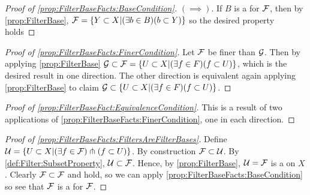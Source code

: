 \begin{prop}[FilterBaseFacts]
\begin{proof}[Proof of \ref{prop:FilterBaseFacts:BaseCondition}]
    $(\implies)$. If $B$ is a \FilterBase for $\mathcal{F}$, then by 
    \ref{prop:FilterBase}, $\mathcal{F}= \{Y \subset X | (\exists b \in B) ( b \subset Y) \}$
    so the desired property holds
   \end{proof}
   \begin{proof}[Proof of \ref{prop:FilterBaseFacts:FinerCondition}]
   Let $\mathcal{F}$ be finer than $\mathcal{G}$. Then 
   by applying \ref{prop:FilterBase}
   $\mathcal{G} \subset \mathcal{F} = \{ U \subset X | (\exists f \in F) (f \subset U) \}$, which is the desired result in one direction. 
   The other direction is equivalent again applying \ref{prop:FilterBase}
   to claim
   $\mathcal{G} \subset \{U \subset X | (\exists f \in F) ( f \subset U ) \}$.
   \end{proof}
   \begin{proof}[Proof of \ref{prop:FilterBaseFact:EquivalenceCondition}]
   This is a result of two applications of \ref{prop:FilterBaseFacts:FinerCondition}, 
   one in each direction. 
   \end{proof}
   \begin{proof}[Proof of \ref{prop:FilterBaseFacts:FiltersAreFilterBases}]
    Define $\mathcal{U} = \{U \subset X | (\exists f \in \mathcal{F}) \pitchfork(f \subset U )\}$. 
    By construction $\mathcal{F} \subset \mathcal{U}$. 
    By \ref{def:Filter:SubsetProperty}, $\mathcal{U} \subset \mathcal{F}$.
    Hence, by \ref{prop:FilterBase}, 
    $\mathcal{U} = \mathcal{F}$ is a \FilterBase on $X$. 
    Clearly $\mathcal{F} \subset \mathcal{F}$ and \scNested{\scF}{\scF} hold, so we can apply
    \ref{prop:FilterBaseFacts:BaseCondition} so see that $\mathcal{F}$ is a \FilterBase
    for $\mathcal{F}$. 
   \end{proof}
\end{prop}
